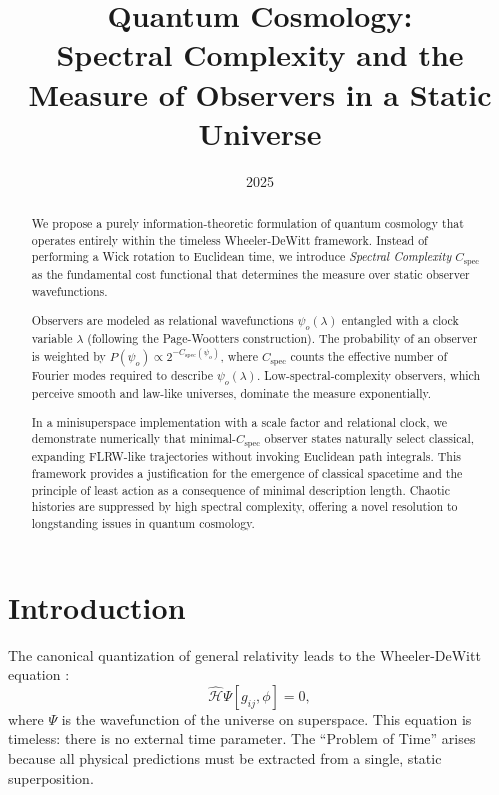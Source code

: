 \documentclass[11pt]{article}
\title{Quantum Cosmology: \\ Spectral Complexity and the Measure of Observers in a Static Universe}
\date{2025}
\begin{document}
\maketitle

\begin{abstract}
  We propose a purely information-theoretic formulation of quantum cosmology that operates entirely within the timeless Wheeler-DeWitt framework.
  Instead of performing a Wick rotation to Euclidean time, we introduce \textit{Spectral Complexity} \(C_{\text{spec}}\) as the fundamental cost functional that determines the measure over static observer wavefunctions. 

  Observers are modeled as relational wavefunctions \(\psi_o(\lambda)\) entangled with a clock variable \(\lambda\) (following the Page-Wootters construction).
  The probability of an observer is weighted by \(P(\psi_o) \propto 2^{-C_{\text{spec}}(\psi_o)}\), where \(C_{\text{spec}}\) counts the effective number of Fourier modes required to describe \(\psi_o(\lambda)\).
  Low-spectral-complexity observers, which perceive smooth and law-like universes, dominate the measure exponentially.

  In a minisuperspace implementation with a scale factor and relational clock, we demonstrate numerically that minimal-\(C_{\text{spec}}\) observer states naturally select classical, expanding FLRW-like trajectories without invoking Euclidean path integrals.
  This framework provides a justification for the emergence of classical spacetime and the principle of least action as a consequence of minimal description length.
  Chaotic histories are suppressed by high spectral complexity, offering a novel resolution to longstanding issues in quantum cosmology.
\end{abstract}

\maketitle

\section{Introduction}

The canonical quantization of general relativity leads to the Wheeler-DeWitt equation \cite{dewitt1967}:
\begin{equation}
\hat{\mathcal{H}} \Psi[g_{ij}, \phi] = 0,
\end{equation}
where \(\Psi\) is the wavefunction of the universe on superspace.
This equation is timeless: there is no external time parameter.
The ``Problem of Time'' \cite{isham1993canonical} arises because all physical predictions must be extracted from a single, static superposition.
\end{document}
